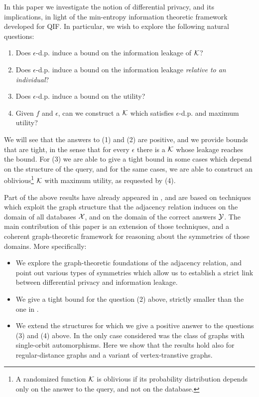 \documentclass{llncs}
\begin{document}
In this paper we investigate the notion of differential privacy, and its implications, in light of the min-entropy information theoretic framework developed for QIF. In particular, we wish to explore  the following natural questions: 
\begin{enumerate}
\item Does $\epsilon$-d.p. induce a bound on the information leakage of $\cal K$? 
\item Does $\epsilon$-d.p. induce a bound on the information leakage \emph{relative to an individual}? 
\item Does $\epsilon$-d.p. induce a bound on the utility? 
\item Given $f$ and $\epsilon$, can we construct a $\cal K$ which satisfies $\epsilon$-d.p. and maximum utility?
\end{enumerate}
We will see that the answers to (1) and (2) are positive, and we provide bounds that are tight, in the sense that for every $\epsilon$ there is a $\cal K$ whose leakage reaches the bound. 
For (3) we are able to give a tight bound in some cases which depend on the structure of the query, and for the same cases, we are able to construct an oblivious\footnote{A randomized function  $\cal K$ is oblivious if its probability distribution depends only on the answer to the query, and not on the database.} $\cal K$ with maximum utility, as requested by (4). 

Part of the above results have already appeared in \cite{Alvim:11:TechRep}, and are based on techniques which exploit the graph structure that the adjacency relation induces on the domain of all databases $\cal X$, and 
on the domain of the correct answers $\cal Y$. The main contribution of this paper is an extension of those techniques, and a coherent graph-theoretic framework for reasoning about the symmetries of those domains. More specifically: 
\begin{itemize}
\item We explore the  graph-theoretic foundations of the adjacency relation, and point out various types of symmetries which allow us to establish a strict link between differential privacy and information leakage. 
\item We give a tight bound for the question (2) above, strictly smaller than the one in \cite{Alvim:11:TechRep}. 
\item We extend the structures for which we give a positive answer to the questions (3) and (4) above. In \cite{Alvim:11:TechRep}
the only case considered was the class  of graphs with single-orbit automorphisms. Here we show that the results hold also for regular-distance graphs and a variant of vertex-transtive graphs. 
\end{itemize}
\end{document}
